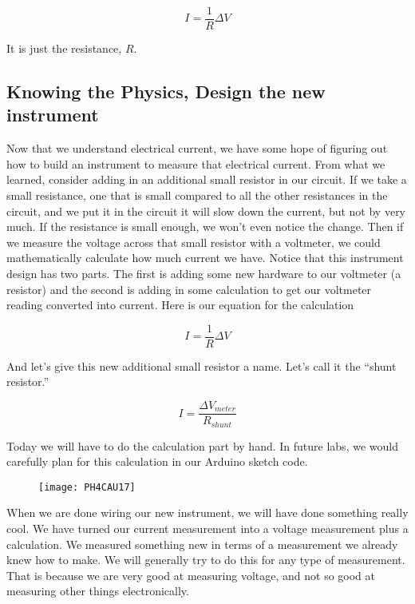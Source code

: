 \begin{equation*}
	I=\frac{1}{R}\Delta V
\end{equation*}

It is just the resistance, $R$.\ 

\subsection{Knowing the Physics, Design the new instrument}

Now that we understand electrical current, we have some hope of figuring out how to build an instrument to measure that electrical current. From what we learned, consider adding in an additional small resistor in our circuit. If we take a small resistance, one that is small compared to all the other resistances in the circuit, and we put it in the circuit it will slow down the current, but not by very much. If the resistance is small enough, we won't even notice the change. Then if we measure the voltage across that small resistor with a voltmeter, we could mathematically calculate how much current we have. Notice that this instrument design has two parts. The first is adding some new hardware to our voltmeter (a resistor) and the second is adding in some calculation to get our voltmeter reading converted into current. Here is our equation for the calculation

\begin{equation*}
I=\frac{1}{R}\Delta V
\end{equation*}

And let's give this new additional small resistor a name. Let's call it the ``shunt resistor.''

\begin{equation*}
	I=\frac{\Delta V_{meter}}{R_{shunt}}
\end{equation*}

Today we will have to do the calculation part by hand. In future labs, we would carefully plan for this calculation in our Arduino sketch code.

\begin{figure}[h!]
	\centering
    \texttt{[image: PH4CAU17]}
\end{figure}

When we are done wiring our new instrument, we will have done something really cool. We have turned our current measurement into a voltage measurement plus a calculation. We measured something new in terms of a measurement we already knew how to make. We will generally try to do this for any type of
measurement. That is because we are very good at measuring voltage, and not so good at measuring other things electronically.

